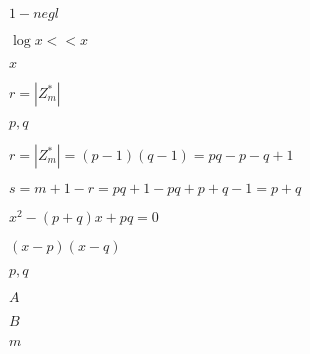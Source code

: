 \documentclass[10pt]{book}
\begin{document}
\begin{mdSnippets}
\begin{mdInlineSnippet}[d684584b682bd9155586461943ac0d4c]
$1 - negl$\end{mdInlineSnippet}%
\begin{mdInlineSnippet}[7a3fc15a1a379940711484f7627ef050]%
$\log x << x$\end{mdInlineSnippet}%
\begin{mdInlineSnippet}[9dd4e461268c8034f5c8564e155c67a6]%
$x$\end{mdInlineSnippet}%
\begin{mdInlineSnippet}%
$r = |Z_m^*|$\end{mdInlineSnippet}%
\begin{mdInlineSnippet}[c1753c36ab4eb582f1420d5178cb4bc5]%
$p,q$\end{mdInlineSnippet}%
\begin{mdInlineSnippet}[a4acc4148b7e04936ab3e677b9902747]%
$r = |Z_m^*| = (p-1)(q-1) = pq - p - q + 1$\end{mdInlineSnippet}%
\begin{mdInlineSnippet}[f8e14309eec1a073b606d3256e83d451]%
$s = m + 1 - r = pq + 1 - pq + p + q - 1 = p + q$\end{mdInlineSnippet}%
\begin{mdInlineSnippet}[0b3e5244bb9c1fa06787d7c008c208b8]%
$x^2 - (p+q)x + pq = 0$\end{mdInlineSnippet}%
\begin{mdInlineSnippet}[a1d1a64f1b5c0ccd5986603a8d7683b7]%
$(x-p)(x-q)$\end{mdInlineSnippet}%
\begin{mdInlineSnippet}[c1753c36ab4eb582f1420d5178cb4bc5]%
$p,q$\end{mdInlineSnippet}%
\begin{mdInlineSnippet}[7fc56270e7a70fa81a5935b72eacbe29]%
$A$\end{mdInlineSnippet}%
\begin{mdInlineSnippet}%
$B$\end{mdInlineSnippet}%
\begin{mdInlineSnippet}[6f8f57715090da2632453988d9a1501b]%
$m$\end{mdInlineSnippet}%
\begin{mdInlineSnippet}%

\end{mdInlineSnippet}
\end{mdSnippets}
\end{document}
